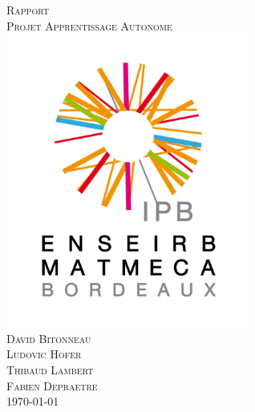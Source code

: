 \documentclass[a4paper, 11pt]{article}
\begin{document}
\begin{titlepage}
\begin{center}
\textsc{\huge Rapport}\\[3cm]
\textsc{\Huge Projet Apprentissage Autonome}\\[3cm]
\includegraphics[width=8cm]{logo-IPB.png}\\[3cm]
\textsc{\Large David Bitonneau}\\
\textsc{\Large Ludovic Hofer}\\
\textsc{\Large Thibaud Lambert}\\
\textsc{\Large Fabien Depraetre}\\[3cm]
\textsc{\Large \today}\\
\end{center}
\end{titlepage}

\clearpage
\tableofcontents
\clearpage



\end{document}
